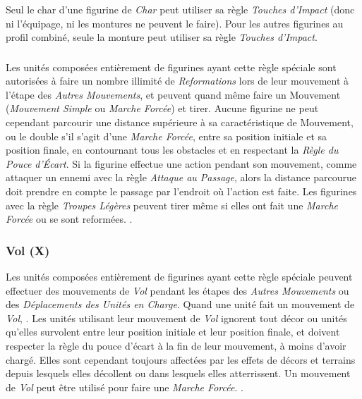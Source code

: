 
Seul le char d'une figurine de \emph{Char} peut utiliser sa règle \emph{Touches d'Impact} (donc ni l'équipage, ni les montures ne peuvent le faire). Pour les autres figurines au profil combiné, seule la monture peut utiliser sa règle \emph{Touches d'Impact}.

\subsubsection*{}

Les unités composées entièrement de figurines ayant cette règle spéciale sont autorisées à faire un nombre illimité de \emph{Reformations} lors de leur mouvement à l'étape des \emph{Autres Mouvements}, et peuvent quand même faire un Mouvement (\emph{Mouvement Simple} ou \emph{Marche Forcée}) et tirer. Aucune figurine ne peut cependant parcourir une distance supérieure à sa caractéristique de Mouvement, ou le double s'il s'agit d'une \emph{Marche Forcée}, entre sa position initiale et sa position finale, en contournant tous les obstacles et en respectant la \emph{Règle du Pouce d'Écart}. Si la figurine effectue une action pendant son mouvement, comme attaquer un ennemi avec la règle \emph{Attaque au Passage}, alors la distance parcourue doit prendre en compte le passage par l'endroit où l'action est faite. Les figurines avec la règle \emph{Troupes Légères} peuvent tirer même si elles ont fait une \emph{Marche Forcée} ou se sont reformées. .

\subsubsection*{Vol (X)}

Les unités composées entièrement de figurines ayant cette règle spéciale peuvent effectuer des mouvements de \emph{Vol} pendant les étapes des \emph{Autres Mouvements} ou des \emph{Déplacements des Unités en Charge}. Quand une unité fait un mouvement de \emph{Vol}, . Les unités utilisant leur mouvement de \emph{Vol} ignorent tout décor ou unités qu'elles survolent entre leur position initiale et leur position finale, et doivent respecter la règle du pouce d'écart à la fin de leur mouvement, à moins d'avoir chargé. Elles sont cependant toujours affectées par les effets de décors et terrains depuis lesquels elles décollent ou dans lesquels elles atterrissent. Un mouvement de \emph{Vol} peut être utilisé pour faire une \emph{Marche Forcée}. .


